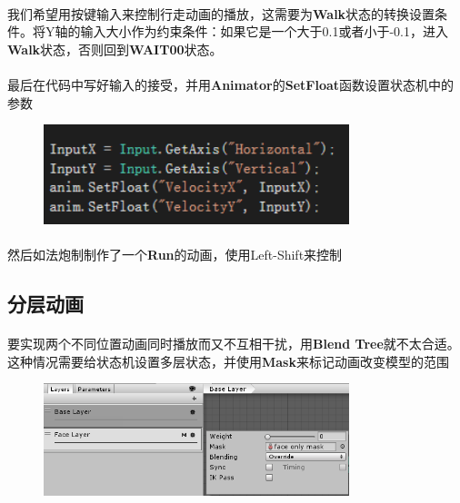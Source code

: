 \documentclass{article}
\begin{document}
\paragraph{}
我们希望用按键输入来控制行走动画的播放，这需要为\textbf{Walk}状态的转换设置条件。将Y轴的输入大小作为约束条件：如果它是一个大于0.1或者小于-0.1，进入\textbf{Walk}状态，否则回到\textbf{WAIT00}状态。
\paragraph{}
最后在代码中写好输入的接受，并用\textbf{Animator}的\textbf{SetFloat}函数设置状态机中的参数
\begin{figure}[H]
  \centering
  \includegraphics[width=24em]{code2.png}\\
  \caption{}\label{2-5}
\end{figure}
\paragraph{}
然后如法炮制制作了一个\textbf{Run}的动画，使用Left-Shift来控制
\subsection{分层动画}
\paragraph{}
要实现两个不同位置动画同时播放而又不互相干扰，用\textbf{Blend Tree}就不太合适。这种情况需要给状态机设置多层状态，并使用\textbf{Mask}来标记动画改变模型的范围
\begin{figure}[H]
  \centering
  \includegraphics[width=24em]{mask.png}\\
  \caption{}\label{2-6}
\end{figure}
\end{document}
